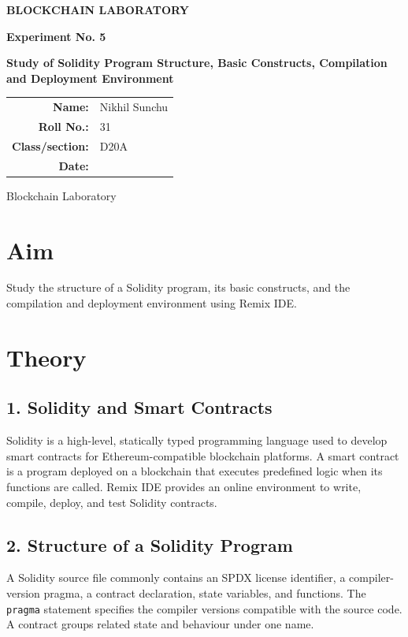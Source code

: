 \documentclass[12pt,a4paper]{article}
\begin{document}
\begin{titlepage}
\centering
\vspace*{1.5cm}
{\Large\bfseries BLOCKCHAIN LABORATORY\par}
\vspace{1.2cm}
{\large\bfseries Experiment No. 5\par}
\vspace{0.8cm}
{\LARGE\bfseries Study of Solidity Program Structure, Basic Constructs, Compilation and Deployment Environment\par}
\vspace{1.5cm}
\begin{tabular}{rl}
\textbf{Name:} & Nikhil Sunchu \\[0.6cm]
\textbf{Roll No.:} & 31 \\[0.6cm]
\textbf{Class/section:} & D20A \\[0.6cm]
\textbf{Date:} & \hrulefill \\[0.6cm]
\end{tabular}
\vfill
{\large Blockchain Laboratory\par}
\end{titlepage}

\section{Aim}
Study the structure of a Solidity program, its basic constructs, and the compilation and deployment environment using Remix IDE.

\section{Theory}
\subsection{1. Solidity and Smart Contracts}
Solidity is a high-level, statically typed programming language used to develop smart contracts for Ethereum-compatible blockchain platforms. A smart contract is a program deployed on a blockchain that executes predefined logic when its functions are called. Remix IDE provides an online environment to write, compile, deploy, and test Solidity contracts.

\subsection{2. Structure of a Solidity Program}
A Solidity source file commonly contains an SPDX license identifier, a compiler-version pragma, a contract declaration, state variables, and functions. The \texttt{pragma} statement specifies the compiler versions compatible with the source code. A contract groups related state and behaviour under one name.
\end{document}
